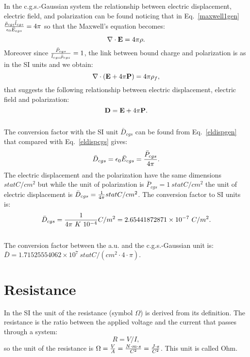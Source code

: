 \documentclass[12pt,a4paper]{article}
\def\dtod{2.65441872871\times 10^{-7}}
\def\bardcgs{1.71525554062\times 10^{7}}
\begin{document}
{\color{orange} In the c.g.s.-Gaussian system the relationship
between electric displacement, electric field, and polarization can 
be found noticing that in Eq.~\ref{maxwell1gen}
${\bar \rho_{cgs} \bar l_{cgs} \over \epsilon_0 \bar E_{cgs}}=4\pi$
so that the Maxwell's equation becomes:
\begin{equation}
\nabla \cdot {\bf E} = 4 \pi \rho.
\end{equation}
Moreover since ${\bar P_{cgs} \over \bar l_{cgs} \bar \rho_{cgs}}=1$,
the link between bound charge and polarization is as in the SI units and
we obtain:
\begin{equation}
\nabla \cdot ({\bf E}+ 4 \pi {\bf P})=4 \pi \rho_f, 
\end{equation}
that suggests the following relationship between electric displacement,
electric field and polarization:
\begin{equation}
{\bf D} =  {\bf E} + 4 \pi {\bf P}.
\label{eldispcgs}
\end{equation}
\\
The conversion factor with the SI unit $\bar D_{cgs}$ can be found
from Eq.~\ref{eldispgen} that compared with Eq.~\ref{eldispcgs} gives:
\begin{equation}
\bar D_{cgs}= {\epsilon_0 \bar E_{cgs}}= {\bar P_{cgs} \over 4 \pi}.
\end{equation}
The electric displacement and the polarization 
have the same dimensions $statC/cm^2$ but while the unit of polarization
is $\bar P_{cgs}=1\ statC/cm^2$ the unit of electric displacement 
is $\bar D_{cgs}={1\over 4 \pi} statC/cm^2$.
The conversion factor to SI units is:
\begin{equation}
\bar D_{cgs}= {1\over 4 \pi\ K\ 10^{-4}} C/m^2=\dtod\ C/m^2. 
\end{equation}
}
\\

{\color{green} 
The conversion factor between the a.u. and the c.g.s.-Gaussian unit is: 
$\bar D = \bardcgs \ statC/(cm^2 \cdot 4 \cdot \pi)$.
}

\newpage
\section{\color{coral}Resistance}
In the SI the unit of the resistance (symbol $\Omega$)
is derived from its definition. The resistance is the ratio between 
the applied voltage and the current that passes through a system:
\begin{equation}
R=V/I,
\end{equation}
so the unit of the resistance is $\Omega={V \over A}=
{N\cdot m \cdot s \over C^2}={J\cdot s \over C^2}$. This
unit is called Ohm.
\\
\end{document}
